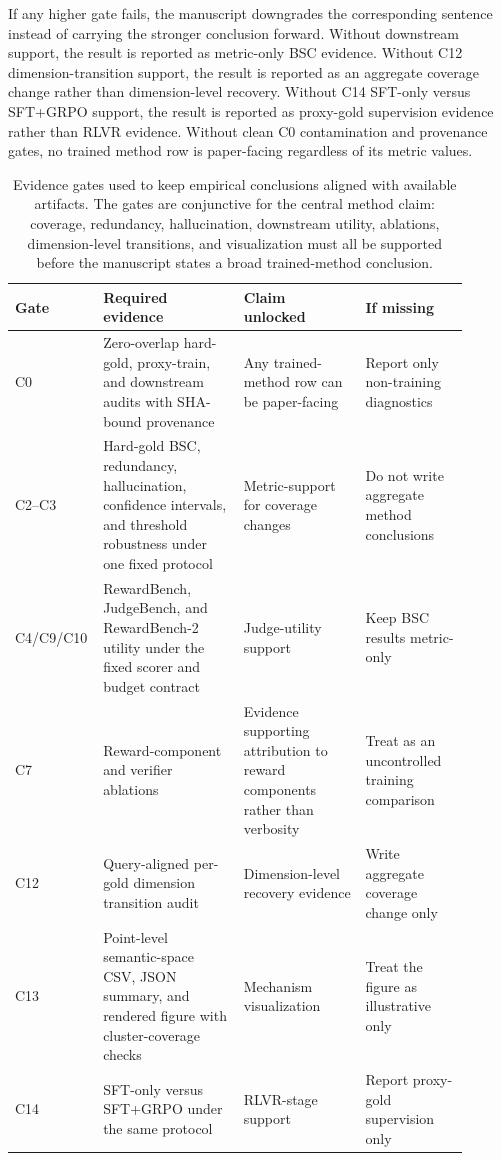 If any higher gate fails, the manuscript downgrades the corresponding sentence
instead of carrying the stronger conclusion forward. Without downstream
support, the result is reported as metric-only BSC evidence. Without C12
dimension-transition support, the result is reported as an aggregate coverage
change rather than dimension-level recovery. Without C14 SFT-only versus SFT+GRPO
support, the result is reported as proxy-gold supervision evidence rather than
RLVR evidence. Without clean C0 contamination and provenance gates, no trained
method row is paper-facing regardless of its metric values.

\begin{table}[t]
\centering
\begin{tabular}{p{0.12\linewidth}p{0.30\linewidth}p{0.26\linewidth}p{0.22\linewidth}}
\toprule
Gate & Required evidence & Claim unlocked & If missing \\
\midrule
C0 & Zero-overlap hard-gold, proxy-train, and downstream audits with
SHA-bound provenance & Any trained-method row can be paper-facing & Report only
non-training diagnostics \\
C2--C3 & Hard-gold BSC, redundancy, hallucination, confidence intervals,
and threshold robustness under one fixed protocol & Metric-support for
coverage changes & Do not write aggregate method conclusions \\
C4/C9/C10 & RewardBench, JudgeBench, and RewardBench-2 utility under the
fixed scorer and budget contract & Judge-utility support & Keep BSC results
metric-only \\
C7 & Reward-component and verifier ablations & Evidence supporting attribution
to reward components rather than verbosity & Treat as an uncontrolled
training comparison \\
C12 & Query-aligned per-gold dimension transition audit & Dimension-level
recovery evidence & Write aggregate coverage change only \\
C13 & Point-level semantic-space CSV, JSON summary, and rendered figure with
cluster-coverage checks & Mechanism visualization & Treat the figure as
illustrative only \\
C14 & SFT-only versus SFT+GRPO under the same protocol & RLVR-stage support &
Report proxy-gold supervision only \\
\bottomrule
\end{tabular}
\caption{Evidence gates used to keep empirical conclusions aligned with
available artifacts. The gates are conjunctive for the central method claim:
coverage, redundancy, hallucination, downstream utility, ablations,
dimension-level transitions, and visualization must all be supported before the
manuscript states a broad trained-method conclusion.}
\label{tab:evidence_gates}
\end{table}


